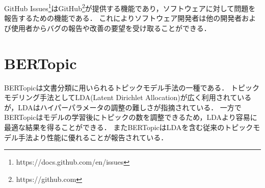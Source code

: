 \documentclass[main]{subfiles}
\begin{document}
GitHub Issues\footnote{https://docs.github.com/en/issues}はGitHub\footnote{https://github.com}が提供する機能であり，ソフトウェアに対して問題を報告するための機能である．
これによりソフトウェア開発者は他の開発者および使用者からバグの報告や改善の要望を受け取ることができる．

\section{BERTopic}

BERTopicは文書分類に用いられるトピックモデル手法の一種である．
トピックモデリング手法としてLDA(Latent Dirichlet Allocation)が広く利用されているが，LDAはハイパーパラメータの調整の難しさが指摘されている\cite{panichella:2021}．
一方でBERTopicはモデルの学習後にトピックの数を調整できるため，LDAより容易に最適な結果を得ることができる．
またBERTopicはLDAを含む従来のトピックモデル手法より性能に優れることが報告されている\cite{egger:2022}．
\end{document}
